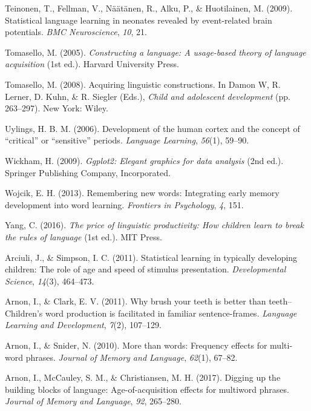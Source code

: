 \documentclass[man,mask,floatsintext]{apa6}
\theoremstyle{definition}
\theoremstyle{definition}
\theoremstyle{definition}
\theoremstyle{remark}
\begin{document}
\hypertarget{ref-teinonen2009statistical}{}
Teinonen, T., Fellman, V., Näätänen, R., Alku, P., \& Huotilainen, M.
(2009). Statistical language learning in neonates revealed by
event-related brain potentials. \emph{BMC Neuroscience}, \emph{10}, 21.

\hypertarget{ref-tomasello2003constructing}{}
Tomasello, M. (2005). \emph{Constructing a language: A usage-based
theory of language acquisition} (1st ed.). Harvard University Press.

\hypertarget{ref-tomasello2006acquiring}{}
Tomasello, M. (2008). Acquiring linguistic constructions. In Damon W, R.
Lerner, D. Kuhn, \& R. Siegler (Eds.), \emph{Child and adolescent
development} (pp. 263--297). New York: Wiley.

\hypertarget{ref-uylings2006development}{}
Uylings, H. B. M. (2006). Development of the human cortex and the
concept of ``critical'' or ``sensitive'' periods. \emph{Language
Learning}, \emph{56}(1), 59--90.

\hypertarget{ref-ggplot2}{}
Wickham, H. (2009). \emph{Ggplot2: Elegant graphics for data analysis}
(2nd ed.). Springer Publishing Company, Incorporated.

\hypertarget{ref-wojcik2013remembering}{}
Wojcik, E. H. (2013). Remembering new words: Integrating early memory
development into word learning. \emph{Frontiers in Psychology},
\emph{4}, 151.

\hypertarget{ref-yang2016price}{}
Yang, C. (2016). \emph{The price of linguistic productivity: How
children learn to break the rules of language} (1st ed.). MIT Press.

\hypertarget{ref-arciuli2011statistical}{}
Arciuli, J., \& Simpson, I. C. (2011). Statistical learning in typically
developing children: The role of age and speed of stimulus presentation.
\emph{Developmental Science}, \emph{14}(3), 464--473.

\hypertarget{ref-arnon2011brush}{}
Arnon, I., \& Clark, E. V. (2011). Why brush your teeth is better than
teeth--Children's word production is facilitated in familiar
sentence-frames. \emph{Language Learning and Development}, \emph{7}(2),
107--129.

\hypertarget{ref-arnon2010more}{}
Arnon, I., \& Snider, N. (2010). More than words: Frequency effects for
multi-word phrases. \emph{Journal of Memory and Language}, \emph{62}(1),
67--82.

\hypertarget{ref-arnon2017}{}
Arnon, I., McCauley, S. M., \& Christiansen, M. H. (2017). Digging up
the building blocks of language: Age-of-acquisition effects for
multiword phrases. \emph{Journal of Memory and Language}, \emph{92},
265--280.
\end{document}
